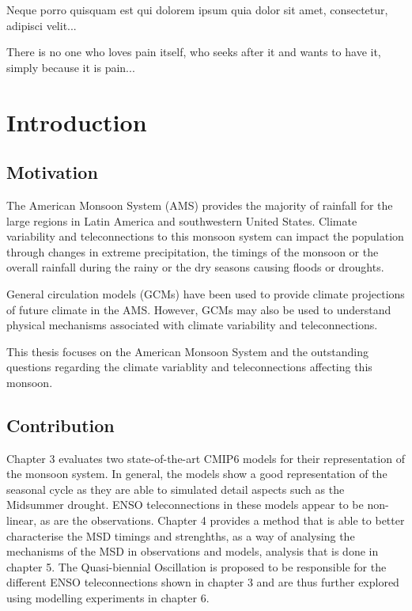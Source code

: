 \begin{savequote}[8cm]
\textlatin{Neque porro quisquam est qui dolorem ipsum quia dolor sit amet, consectetur, adipisci velit...}

There is no one who loves pain itself, who seeks after it and wants to have it, simply because it is pain...
\end{savequote}

\chapter{\label{ch:1-intro}Introduction} 

\minitoc



\section{Motivation}

The American Monsoon System (AMS) provides the majority of rainfall for the large regions in Latin America and southwestern United States. 
Climate variability and teleconnections to this monsoon system can impact the population through changes in extreme precipitation, the timings of the monsoon or the overall rainfall during the rainy or the dry seasons causing floods or droughts.  

General circulation models (GCMs) have been used to provide climate projections of future climate in the AMS. However, GCMs may also be used to understand physical mechanisms associated with climate variability and teleconnections. 

 This thesis focuses on the American Monsoon System and the outstanding questions regarding the climate variablity and teleconnections affecting this monsoon.
\section{Contribution}

 Chapter 3 evaluates two state-of-the-art CMIP6 models for their representation of the monsoon system. In general, the models show a good representation of the seasonal cycle as they are able to simulated detail aspects such as the Midsummer drought. ENSO teleconnections in these models appear to be non-linear, as are the observations. Chapter 4 provides a method that is able to better characterise the MSD timings and strenghths, as a way of analysing the mechanisms of the MSD in observations and models, analysis that is done in chapter 5. The Quasi-biennial Oscillation is proposed to be responsible for the different ENSO teleconnections shown in chapter 3 and are thus further explored using modelling experiments in chapter 6. 